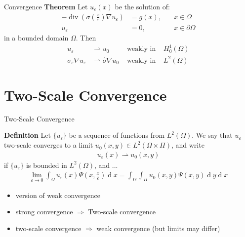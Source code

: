 \documentclass[10pt]{beamer}	%
\begin{document}
\begin{frame}{Convergence}
\textbf{Theorem}
Let 
$u_\varepsilon(x)$ be the solution of:
\begin{align*}
-\operatorname{div} (\sigma(\frac{x}{\varepsilon}) \nabla u_{\varepsilon}) &= g(x) , \quad & x \in \Omega\\
u_{\varepsilon} &= 0, \quad &x \in \partial \Omega
\end{align*}
in a bounded domain $\Omega$. Then 
\begin{align*}
u_{\varepsilon} &\rightharpoonup u_0 &\text{ weakly in } &H^1_0(\Omega)\\
\sigma_{\varepsilon}\nabla u_{\varepsilon} &\rightharpoonup \hat \sigma \nabla u_0 &\text{ weakly in } &L^2(\Omega)
\end{align*}
\end{frame}


%

%
\section{Two-Scale Convergence}
\begin{frame}{Two-Scale Convergence}

\textbf{Definition}
Let $\{u_\varepsilon\}$ be a sequence of functions from $L^2(\Omega)$. We say that $u_\varepsilon$ two-scale converges to a limit
$u_0(x,y)\in L^2(\Omega \times \Pi)$, and write 
\begin{align*}
u_\varepsilon(x) \rightharpoonup u_0(x,y)
\end{align*}
if $\{u_\varepsilon\}$ is bounded in $L^2(\Omega)$, and ...
\begin{align*}
\lim_{\varepsilon \to 0} \int_
{\Omega} u_\varepsilon (x) \Psi(x,\frac{x}{\varepsilon}) \operatorname d x = \int_{\Omega} \int_\Pi u_0(x,y) \Psi(x,y)\operatorname d y \operatorname d x
\end{align*}

\begin{itemize}
\item version of weak convergence
\item strong convergence $\Rightarrow$ Two-scale convergence
\item two-scale convergence $\Rightarrow$ weak convergence (but limits may differ)
\end{itemize}
\end{frame}


\end{document}

